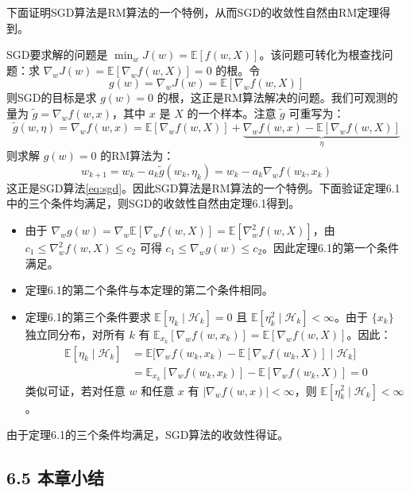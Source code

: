 \documentclass[UTF8]{article}
\begin{document}
\begin{proofbox}
    下面证明SGD算法是RM算法的一个特例，从而SGD的收敛性自然由RM定理得到。

    SGD要求解的问题是 $\min_w J(w) = \mathbb{E}[f(w, X)]$。该问题可转化为根查找问题：求 $\nabla_w J(w) = \mathbb{E}[\nabla_w f(w, X)] = 0$ 的根。令
    \[
    g(w) = \nabla_w J(w) = \mathbb{E}[\nabla_w f(w, X)]
    \]
    则SGD的目标是求 $g(w) = 0$ 的根，这正是RM算法解决的问题。我们可观测的量为 $\tilde{g} = \nabla_w f(w, x)$，其中 $x$ 是 $X$ 的一个样本。注意 $\tilde{g}$ 可重写为：
    \[
    \tilde{g}(w, \eta) = \nabla_w f(w, x) = \mathbb{E}[\nabla_w f(w, X)] + \underbrace{\nabla_w f(w, x) - \mathbb{E}[\nabla_w f(w, X)]}_{\eta}
    \]
    则求解 $g(w) = 0$ 的RM算法为：
    \[
    w_{k+1} = w_k - a_k \tilde{g}(w_k, \eta_k) = w_k - a_k \nabla_w f(w_k, x_k)
    \]
    这正是SGD算法\eqref{eq:sgd}。因此SGD算法是RM算法的一个特例。下面验证定理6.1中的三个条件均满足，则SGD的收敛性自然由定理6.1得到。

    \begin{itemize}
        \item 由于 $\nabla_w g(w) = \nabla_w \mathbb{E}[\nabla_w f(w, X)] = \mathbb{E}[\nabla_w^2 f(w, X)]$，由 $c_1 \leq \nabla_w^2 f(w, X) \leq c_2$ 可得 $c_1 \leq \nabla_w g(w) \leq c_2$。因此定理6.1的第一个条件满足。
        \item 定理6.1的第二个条件与本定理的第二个条件相同。
        \item 定理6.1的第三个条件要求 $\mathbb{E}[\eta_k \mid \mathcal{H}_k] = 0$ 且 $\mathbb{E}[\eta_k^2 \mid \mathcal{H}_k] < \infty$。由于 $\{x_k\}$ 独立同分布，对所有 $k$ 有 $\mathbb{E}_{x_k}[\nabla_w f(w, x_k)] = \mathbb{E}[\nabla_w f(w, X)]$。因此：
        \[
        \begin{aligned}
        \mathbb{E}[\eta_k \mid \mathcal{H}_k] &= \mathbb{E}\big[\nabla_w f(w_k, x_k) - \mathbb{E}[\nabla_w f(w_k, X)] \mid \mathcal{H}_k\big] \\
        &= \mathbb{E}_{x_k}[\nabla_w f(w_k, x_k)] - \mathbb{E}[\nabla_w f(w_k, X)] = 0
        \end{aligned}
        \]
        类似可证，若对任意 $w$ 和任意 $x$ 有 $|\nabla_w f(w, x)| < \infty$，则 $\mathbb{E}[\eta_k^2 \mid \mathcal{H}_k] < \infty$。
    \end{itemize}

    由于定理6.1的三个条件均满足，SGD算法的收敛性得证。
\end{proofbox}

\subsection*{6.5 本章小结}
\end{document}
